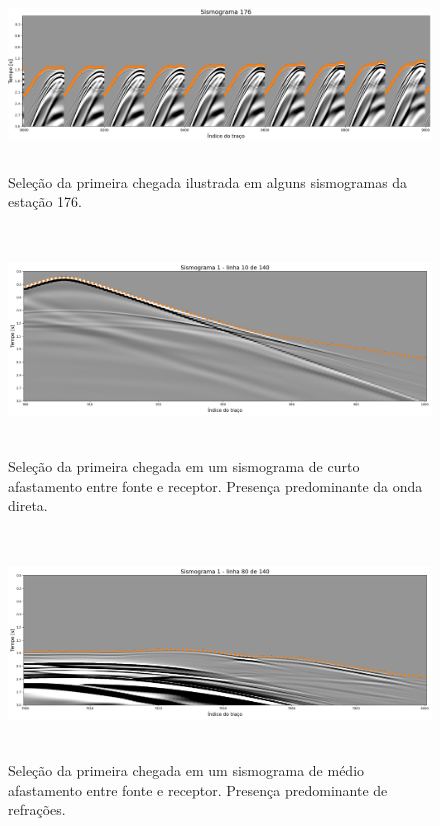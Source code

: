 \begin{figure}[H]
	\centering
	\includegraphics[width=16cm,height=5cm]{Imgs/Metodologia/gather_example.png}
	\caption{Seleção da primeira chegada ilustrada em alguns sismogramas da estação 176.}
	\label{fig:gather_example}	
\end{figure}





\begin{figure}[H]
	\centering
	\includegraphics[width=16cm,height=6cm]{Imgs/Metodologia/linha10_sismo1.png}
	\caption{Seleção da primeira chegada em um sismograma de curto afastamento entre fonte e receptor. Presença predominante da onda direta.}
	\label{fig:gather_picking_near}	
\end{figure}

\begin{figure}[H]
	\centering
	\includegraphics[width=16cm,height=6cm]{Imgs/Metodologia/linha80_sismo1.png}
	\caption{Seleção da primeira chegada em um sismograma de médio afastamento entre fonte e receptor. Presença predominante de refrações.}
	\label{fig:gather_picking_mid}	
\end{figure}

